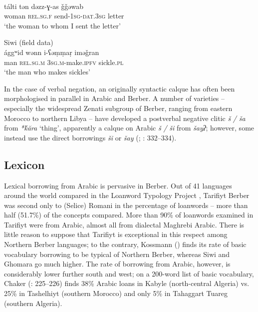 \documentclass[output=paper]{langsci/langscibook}
\begin{document}
\ea\label{ex:key:}
\\
\gll tálti tən dəzz-ɣ{}-as ǧǧəwab\\
woman \textsc{rel.sg.f} send-\textsc{1sg-dat.3sg} letter\\
\glt `the woman to whom I sent the letter' \\
     \z
     
\ea\label{ex:key:}
{ Siwi (field data)}\\
\gll ággʷid wənn i-ʕəṃṃaṛ iməǧran\\
man \textsc{rel.sg.m} \textsc{3sg.m}{}-make.\textsc{ipfv} sickle.\textsc{pl}\\
\glt `the man who makes sickles' 
\z

In the case of verbal negation, an originally syntactic calque has often been morphologised in parallel in Arabic and Berber. A number of varieties – especially the widespread Zenati subgroup of Berber, ranging from eastern Morocco to northern Libya – have developed a postverbal negative clitic \textit{š} \textit{/} \textit{ša} from \textit{*\'{k}ăra} `thing', apparently a calque on Arabic \textit{š} \textit{/} \textit{ši} from \textit{šayʔ}; however, some instead use the direct borrowings \textit{ši} or \textit{šay} (\citealt{Lucas2007}; \citealt{Kossmann2013book}: 332–334).


 
 \subsection{Lexicon}


Lexical borrowing from Arabic is pervasive in Berber. Out of 41 languages around the world compared in the Loanword Typology Project \citep{Tadmor2009}, Tarifiyt Berber was second only to (Selice) Romani in the percentage of loanwords – more than half (51.7\%) of the concepts compared. More than 90\% of loanwords examined in Tarifiyt were from Arabic, almost all from dialectal Maghrebi Arabic.  There is little reason to suppose that Tarifiyt is exceptional in this respect among Northern Berber languages; to the contrary, Kossmann (\citeyear[110]{Kossmann2013book}) finds its rate of basic vocabulary borrowing to be typical of Northern Berber, whereas Siwi and Ghomara go much higher. The rate of borrowing from Arabic, however, is considerably lower further south and west; on a 200-word list of basic vocabulary, Chaker (\citeyear{Chaker1984}: 225–226) finds 38\% Arabic loans in Kabyle (north-central Algeria) vs. 25\% in Tashelhiyt (southern Morocco) and only 5\% in Tahaggart Tuareg (southern Algeria).
\end{document}
